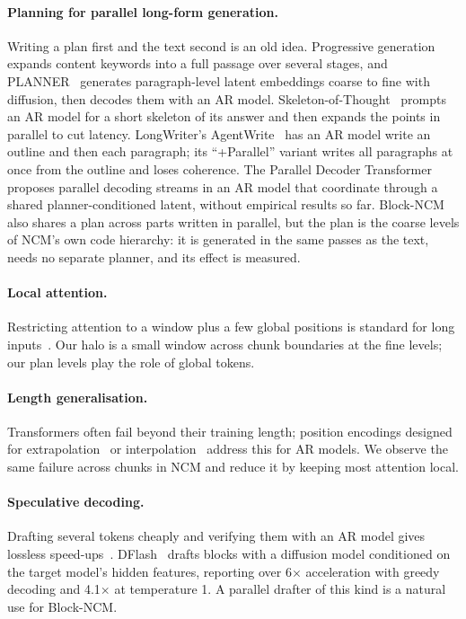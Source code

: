 \documentclass[10pt,twocolumn]{article}
\begin{document}
\paragraph{Planning for parallel long-form generation.} Writing a plan first and the text second is an old idea.
Progressive generation~\cite{progressive} expands content keywords into a full passage over several stages, and
PLANNER~\cite{planner} generates paragraph-level latent embeddings coarse to fine with diffusion, then decodes
them with an AR model. Skeleton-of-Thought~\cite{sot} prompts an AR model for a short skeleton of its answer and
then expands the points in parallel to cut latency. LongWriter's AgentWrite~\cite{longwriter} has an AR model
write an outline and then each paragraph; its ``+Parallel'' variant writes all paragraphs at once from the outline and
loses coherence. The Parallel Decoder Transformer~\cite{pdt} proposes parallel decoding streams in an AR model that
coordinate through a shared planner-conditioned latent, without empirical results so far. Block-NCM also shares a
plan across parts written in parallel, but the plan is the coarse levels of NCM's own code hierarchy: it is generated
in the same passes as the text, needs no separate planner, and its effect is measured.

\paragraph{Local attention.} Restricting attention to a window plus a few global positions is standard for long
inputs~\cite{longformer}. Our halo is a small window across chunk boundaries at the fine levels; our plan levels play
the role of global tokens.

\paragraph{Length generalisation.} Transformers often fail beyond their training length; position encodings designed
for extrapolation~\cite{alibi} or interpolation~\cite{rope} address this for AR models. We observe the same failure
across chunks in NCM and reduce it by keeping most attention local.

\paragraph{Speculative decoding.} Drafting several tokens cheaply and verifying them with an AR model gives lossless
speed-ups~\cite{leviathan2023}. DFlash~\cite{dflash} drafts blocks with a diffusion model conditioned on the target
model's hidden features, reporting over 6$\times$ acceleration with greedy decoding and 4.1$\times$ at temperature 1.
A parallel drafter of this kind is a natural use for Block-NCM.
\end{document}
